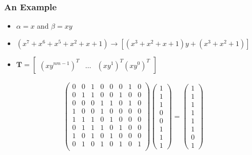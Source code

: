 \documentclass[handout]{beamer}
\begin{document}
\begin{frame}
\frametitle{An Example}
\begin{itemize}
	\item $\alpha = x$ and $\beta = xy$
	\item $(x^7 + x^6 + x^5 + x^2 + x + 1) \to [(x^3 + x^2 + x + 1)y + (x^3 + x^2 + 1)]$
	\item $\textbf{T} =  \left[ \begin{array}{cccc}
(xy^{nm - 1})^T & \dots & (xy^{1})^T (xy^{0})^T \end{array} \right]$
\end{itemize}

\begin{align*}
\left( \begin{array}{cccccccc}
0 & 0 & 1 & 0 & 0 & 0 & 1 & 0 \\
0 & 1 & 1 & 0 & 0 & 1 & 0 & 0 \\
0 & 0 & 0 & 1 & 1 & 0 & 1 & 0 \\
1 & 0 & 0 & 1 & 0 & 0 & 0 & 0 \\
1 & 1 & 1 & 0 & 1 & 0 & 0 & 0 \\
0 & 1 & 1 & 1 & 0 & 1 & 0 & 0 \\
1 & 0 & 1 & 0 & 1 & 0 & 0 & 0 \\
0 & 1 & 0 & 1 & 0 & 1 & 0 & 1 \\ \end{array} \right) \left( \begin{array}{c}
1 \\
1 \\
1 \\ 
0 \\
0 \\ 
1 \\
1 \\ 
1 \end{array} \right) = \left( \begin{array}{c}
1 \\
1 \\
1 \\ 
1 \\
1 \\ 
1 \\
0 \\ 
1 \end{array} \right)
\end{align*}
\end{frame}
\end{document}

